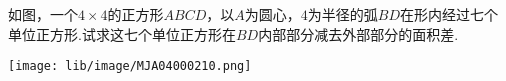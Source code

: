 如图，一个$4\times4$的正方形$ABCD$，以$A$为圆心，$4$为半径的弧$BD$在形内经过七个单位正方形.试求这七个单位正方形在$BD$内部部分减去外部部分的面积差.

\begin{center}
    \texttt{[image: lib/image/MJA04000210.png]}
\end{center}